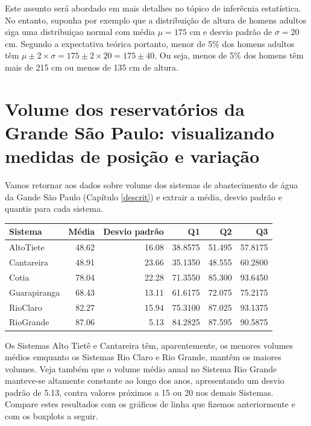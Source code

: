 \documentclass[
]{book}
\begin{document}
Este assunto será abordado em mais detalhes no tópico de inferêcnia estatística. No entanto, suponha por exemplo que a distribuição de altura de homens adultos siga uma distribuiçao normal com média \(\mu = 175\) cm e desvio padrão de \(\sigma = 20\) cm. Segundo a expectativa teórica portanto, menor de 5\% dos homens adultos têm \(\mu \pm 2 \times \sigma = 175 \pm 2 \times 20 = 175 \pm 40\). Ou seja, menos de 5\% dos homens têm mais de 215 cm ou menos de 135 cm de altura.

\hypertarget{volume-dos-reservatuxf3rios-da-grande-suxe3o-paulo-visualizando-medidas-de-posiuxe7uxe3o-e-variauxe7uxe3o}{%
\section{Volume dos reservatórios da Grande São Paulo: visualizando medidas de posição e variação}\label{volume-dos-reservatuxf3rios-da-grande-suxe3o-paulo-visualizando-medidas-de-posiuxe7uxe3o-e-variauxe7uxe3o}}

Vamos retornar aos dados sobre volume dos sistemas de abastecimento de água da Gande São Paulo (Capítulo \ref{descrit}) e extrair a média, desvio padrão e quantis para cada sistema.

\begin{tabular}{l|r|r|r|r|r}
\hline
Sistema & Média & Desvio padrão & Q1 & Q2 & Q3\\
\hline
AltoTiete & 48.62 & 16.08 & 38.8575 & 51.495 & 57.8175\\
\hline
Cantareira & 48.91 & 23.66 & 35.1350 & 48.555 & 60.2800\\
\hline
Cotia & 78.04 & 22.28 & 71.3550 & 85.300 & 93.6450\\
\hline
Guarapiranga & 68.43 & 13.11 & 61.6175 & 72.075 & 75.2175\\
\hline
RioClaro & 82.27 & 15.94 & 75.3100 & 87.025 & 93.1375\\
\hline
RioGrande & 87.06 & 5.13 & 84.2825 & 87.595 & 90.5875\\
\hline
\end{tabular}

Os Sistemas Alto Tietê e Cantareira têm, aparentemente, os menores volumes médios emquanto os Sistemas Rio Claro e Rio Grande, mantêm os maiores volumes. Veja também que o volume médio anual no Sistema Rio Grande manteve-se altamente constante ao longo dos anos, apresentando um desvio padrão de 5.13, contra valores próximos a 15 ou 20 nos demais Sistemas. Compare estes resultados com os gráficos de linha que fizemos anteriormente e com os boxplots a seguir.
\end{document}
